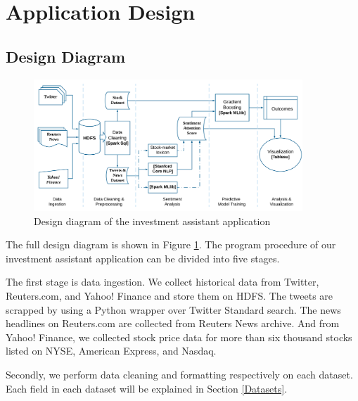 \documentclass[conference]{IEEEtran}
\begin{document}
\section{Application Design}\label{Design}
\subsection{Design Diagram}
\begin{figure}[tp]
\centering
\includegraphics[width=0.9\textwidth]{pics/appdesign.png}
\caption{Design diagram of the investment assistant application}
\label{design}
\end{figure}

The full design diagram is shown in Figure \ref{design}. The program procedure of our investment assistant application can be divided into five stages.

The first stage is data ingestion. We collect historical data from Twitter, Reuters.com, and Yahoo! Finance and store them on HDFS. The tweets are scrapped by using a Python wrapper over Twitter Standard search. The news headlines on Reuters.com are collected from Reuters News archive. And from Yahoo! Finance, we collected stock price data for more than six thousand stocks listed on NYSE, American Express, and Nasdaq.

Secondly, we perform data cleaning and formatting respectively on each dataset. Each field in each dataset will be explained in Section \ref{Datasets}.
\end{document}
